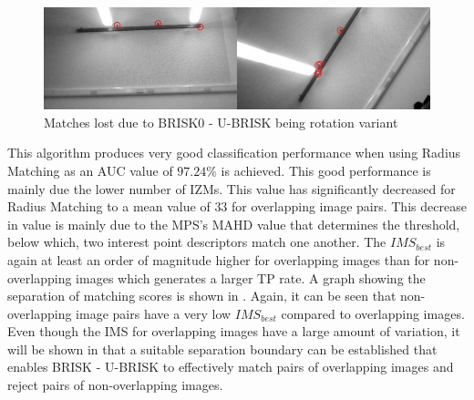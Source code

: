 \documentclass{report}
\begin{document}
\begin{figure}
  \centering
    \includegraphics[width=1.0\textwidth]{../Drawings/Matching/rotationsUBRISK.jpg}
    \caption{Matches lost due to BRISK0 - U-BRISK being rotation variant} 
    \label{fig:rotationUbrisk}
\end{figure}


This algorithm produces very good classification performance when using Radius Matching as an AUC value of $97.24\%$ is achieved. This good performance is mainly due the lower number of IZMs. This value has significantly decreased for Radius Matching to a mean value of $33$ for overlapping image pairs. This decrease in value is mainly due to the MPS's MAHD value that determines the threshold, below which, two interest point descriptors match one another. The $IMS_{best}$ is again at least an order of magnitude higher for overlapping images than for non-overlapping images which generates a larger TP rate. A graph showing the separation of matching scores is shown in . Again, it can be seen that non-overlapping image pairs have a very low $IMS_{best}$ compared to overlapping images. Even though the IMS for overlapping images have a large amount of variation, it will be shown in  that a suitable separation boundary can be established that enables BRISK - U-BRISK to effectively match pairs of overlapping images and reject pairs of non-overlapping images.\\
\end{document}
